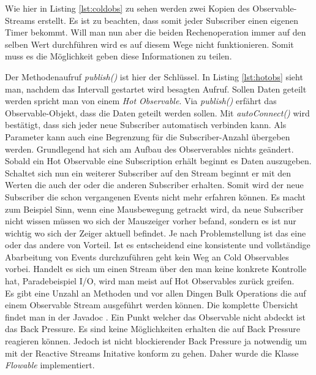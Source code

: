 
Wie hier in Listing \ref{lst:coldobs} zu sehen werden zwei Kopien des Observable-Streams erstellt. Es ist zu beachten, dass somit jeder Subscriber einen eigenen Timer bekommt. Will man nun aber die beiden Rechenoperation immer auf den selben Wert durchführen wird es auf diesem Wege nicht funktionieren. Somit muss es die Möglichkeit geben diese Informationen zu teilen.

Der Methodenaufruf \textit{publish()} ist hier der Schlüssel. In Listing \ref{lst:hotobs} sieht man, nachdem das Intervall gestartet wird besagten Aufruf. Sollen Daten geteilt werden spricht man von einem \textit{Hot Observable}. Via \textit{publish()} erfährt das Observable-Objekt, dass die Daten geteilt werden sollen. Mit \textit{autoConnect()} wird bestätigt, dass sich jeder neue Subscriber automatisch verbinden kann. Als Parameter kann auch eine Begrenzung für die Subscriber-Anzahl übergeben werden. Grundlegend hat sich am Aufbau des Observerables nichts geändert. Sobald ein Hot Observable eine Subscription erhält beginnt es Daten auszugeben. Schaltet sich nun ein weiterer Subscriber auf den Stream beginnt er mit den Werten die auch der oder die anderen Subscriber erhalten. Somit wird der neue Subscriber die schon vergangenen Events nicht mehr erfahren können. Es macht zum Beispiel Sinn, wenn eine Mausbewegung getrackt wird, da neue Subscriber nicht wissen müssen wo sich der Mauszeiger vorher befand, sondern es ist nur wichtig wo sich der Zeiger aktuell befindet. Je nach Problemstellung ist das eine oder das andere von Vorteil. Ist es entscheidend eine konsistente und vollständige Abarbeitung von Events durchzuführen geht kein Weg an Cold Observables vorbei. Handelt es sich um einen Stream über den man keine konkrete Kontrolle hat, Paradebeispiel I/O, wird man meist auf Hot Observables zurück greifen. \\ Es gibt eine Unzahl an Methoden und vor allen Dingen Bulk Operations die auf einem Observable Stream ausgeführt werden können. Die komplette Übersicht findet man in der Javadoc \cite{rxajavadoc}. Ein Punkt welcher das Observable nicht abdeckt ist das Back Pressure. Es sind keine Möglichkeiten erhalten die auf Back Pressure reagieren können. Jedoch ist nicht blockierender Back Pressure ja notwendig um mit der Reactive Streams Initative konform zu gehen. Daher wurde die Klasse \textit{Flowable} implementiert.
